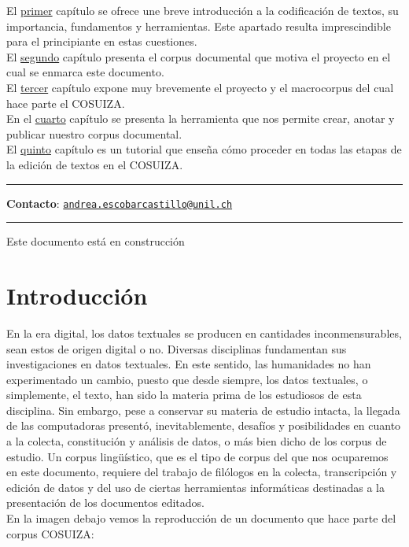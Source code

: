\documentclass[
]{book}
\begin{document}
El \protect\hyperlink{introducciuxf3n}{primer} capítulo se ofrece une breve introducción a la codificación de textos, su importancia, fundamentos y herramientas. Este apartado resulta imprescindible para el principiante en estas cuestiones.\\
El \protect\hyperlink{cosuiza}{segundo} capítulo presenta el corpus documental que motiva el proyecto en el cual se enmarca este documento.\\
El \protect\hyperlink{charta}{tercer} capítulo expone muy brevemente el proyecto y el macrocorpus del cual hace parte el COSUIZA.\\
En el \protect\hyperlink{teitok}{cuarto} capítulo se presenta la herramienta que nos permite crear, anotar y publicar nuestro corpus documental.\\
El \protect\hyperlink{ediciuxf3n-de-textos-en-cosuizateitok}{quinto} capítulo es un tutorial que enseña cómo proceder en todas las etapas de la edición de textos en el COSUIZA.

\begin{center}\rule{0.5\linewidth}{0.5pt}\end{center}

\textbf{Contacto}: \href{mailto:andrea.escobarcastillo@unil.ch}{\nolinkurl{andrea.escobarcastillo@unil.ch}}

\begin{center}\rule{0.5\linewidth}{0.5pt}\end{center}

Este documento está en construcción

\hypertarget{introducciuxf3n}{%
\chapter*{Introducción}\label{introducciuxf3n}}

En la era digital, los datos textuales se producen en cantidades inconmensurables, sean estos de origen digital o no. Diversas disciplinas fundamentan sus investigaciones en datos textuales. En este sentido, las humanidades no han experimentado un cambio, puesto que desde siempre, los datos textuales, o simplemente, el texto, han sido la materia prima de los estudiosos de esta disciplina.
Sin embargo, pese a conservar su materia de estudio intacta, la llegada de las computadoras presentó, inevitablemente, desafíos y posibilidades en cuanto a la colecta, constitución y análisis de datos, o más bien dicho de los corpus de estudio.
Un corpus lingüístico, que es el tipo de corpus del que nos ocuparemos en este documento, requiere del trabajo de filólogos en la colecta, transcripción y edición de datos y del uso de ciertas herramientas informáticas destinadas a la presentación de los documentos editados.\\
En la imagen debajo vemos la reproducción de un documento que hace parte del corpus COSUIZA:\\
\end{document}
